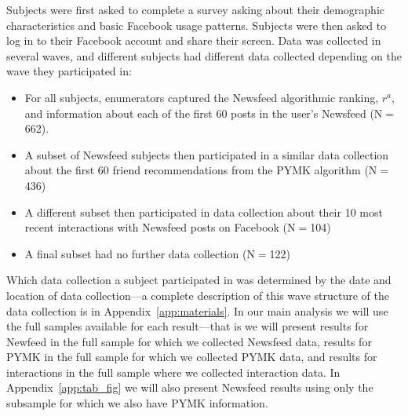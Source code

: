 \documentclass[12pt,letterpaper]{article}
\newcommand{\FullNFUSSurveySampleSize}{662}
\newcommand{\PYMKUSSurveySampleSize}{436}
\newcommand{\RecentInteractionsSampleSize}{104}
\newcommand{\NoFurtherSampleSize}{122}
\begin{document}
Subjects were first asked to complete a survey asking about their demographic characteristics and basic Facebook usage patterns. Subjects were then asked to log in to their Facebook account and share their screen. Data was collected in several waves, and different subjects had different data collected depending on the wave they participated in:
\begin{itemize}
    \item For all subjects, enumerators captured the Newsfeed algorithmic ranking, $r^a$, and information about each of the first 60 posts in the user's Newsfeed (N$=$\FullNFUSSurveySampleSize{}).
    \item A subset of Newsfeed subjects then participated in a similar data collection about the first 60 friend recommendations from the PYMK algorithm (N$=$\PYMKUSSurveySampleSize{})
    \item A different subset then participated in data collection about their 10 most recent interactions with Newsfeed posts on Facebook (N$=$\RecentInteractionsSampleSize{})
    \item A final subset had no further data collection (N$=$\NoFurtherSampleSize{})
\end{itemize}
Which data collection a subject participated in was determined by the date and location of data collection---a complete description of this wave structure of the data collection is in Appendix~\ref{app:materials}. In our main analysis we will use the full samples available for each result---that is we will present results for Newfeed in the full sample for which we collected Newsfeed data, results for PYMK in the full sample for which we collected PYMK data, and results for interactions in the full sample where we collected interaction data. In Appendix~\ref{app:tab_fig} we will also present Newsfeed results using only the subsample for which we also have PYMK information.
\end{document}
